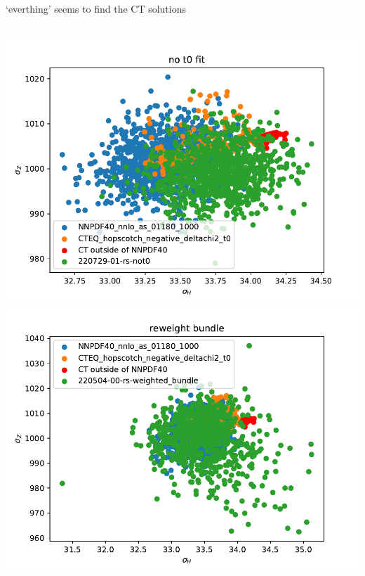 \documentclass[aspectratio=169,10pt]{beamer}
\begin{document}
\begin{frame}[t]{`everthing' seems to find the CT solutions}
\begin{columns}
\begin{column}{.7\textwidth}
      \includegraphics[height=.45\textheight]{no_t0_fit.pdf}
      \includegraphics[height=.45\textheight]{reweight_bundle.pdf}
    \end{column}
  \end{columns}
\end{frame}
\end{document}
